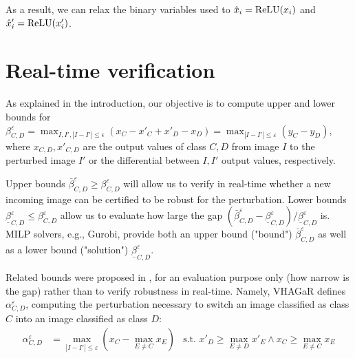 	As a result, we can relax the binary variables used to $\hat{x}_i = \mathrm{ReLU}(x_i)$ and $\hat{x}'_i = \mathrm{ReLU}(x'_i)$.
	\fi


\newpage	
	
\section{Real-time verification}

As explained in the introduction, our objective is to compute upper and lower bounds for 
$\beta^{\varepsilon}_{C,D} = 
	\max_{I,I', |I-I'| \leq \epsilon}(x_C - x'_C + x'_D - x_D) = 
    \max_{|I-I'| \leq \varepsilon}(y_C - y_D)
$,
where $x_{C,D},x'_{C,D}$ are the output values of class $C,D$ from image $I$ to the perturbed image $I'$ or the differential between $I,I'$ output values, respectively.

Upper bounds  $\bar{\beta}^{\varepsilon}_{C,D} \geq \beta^{\varepsilon}_{C,D}$ will allow us to verify in real-time whether a new incoming image can be certified to be robust for the perturbation. Lower bounds
$\underline{\beta}^{\varepsilon}_{C,D} \leq \beta^{\varepsilon}_{C,D}$
allow us to evaluate how large the gap 
$(\bar{\beta}^{\varepsilon}_{C,D} - \underline{\beta}^{\varepsilon}_{C,D}) / \underline{\beta}^{\varepsilon}_{C,D}$ is. MILP solvers, e.g., Gurobi, provide both an upper bound ("bound") $\bar{\beta}^{\varepsilon}_{C,D}$
as well as a lower bound ("solution") $\underline{\beta}^{\varepsilon}_{C,D}$.


Related bounds were proposed in \cite{vhagar}, for an evaluation purpose only (how narrow is the gap) rather than to verify robustness in real-time. 
Namely, VHAGaR \cite{vhagar} defines $\alpha^{\varepsilon}_{C,D}$, computing the perturbation necessary to switch an image classified as class $C$ into an image classified as class $D$:
\begin{align*}
	\alpha^{\varepsilon}_{C,D} &= \max_{|I-I'| \leq \varepsilon} (x_C-\max_{E\neq C}x_E) &\text{s.t. }  x'_D \geq \max_{E\neq D}x'_E \wedge x_C \geq \max_{E\neq C}x_E 
\end{align*}

